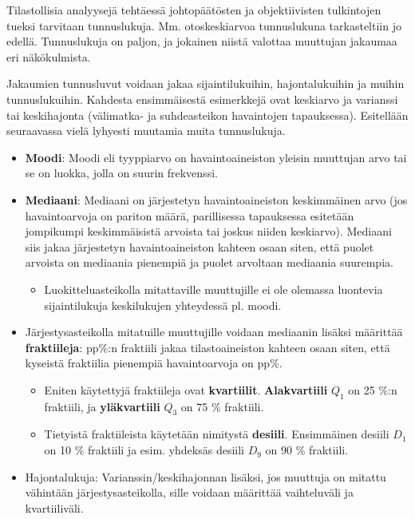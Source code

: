 \documentclass[
]{book}
\providecommand{\tightlist}{%
  \setlength{\itemsep}{0pt}\setlength{\parskip}{0pt}}
\begin{document}
Tilastollisia analyysejä tehtäessä johtopäätösten ja objektiivisten tulkintojen tueksi tarvitaan tunnuslukuja. Mm. otoskeskiarvoa tunnuslukuna tarkasteltiin jo edellä. Tunnuslukuja on paljon, ja jokainen niistä valottaa muuttujan jakaumaa eri näkökulmista.

Jakaumien tunnusluvut voidaan jakaa sijaintilukuihin, hajontalukuihin ja muihin tunnuslukuihin. Kahdesta ensimmäisestä esimerkkejä ovat keskiarvo ja varianssi tai keskihajonta (välimatka- ja suhdeasteikon havaintojen tapauksessa). Esitellään seuraavassa vielä lyhyesti muutamia muita tunnuslukuja.

\begin{itemize}
\tightlist
\item
  \textbf{Moodi}: Moodi eli tyyppiarvo on havaintoaineiston yleisin muuttujan arvo tai se on luokka, jolla on suurin frekvenssi.
\item
  \textbf{Mediaani}: Mediaani on järjestetyn havaintoaineiston keskimmäinen arvo (jos havaintoarvoja on pariton määrä, parillisessa tapauksessa esitetään jompikumpi keskimmäisistä arvoista tai joskus niiden keskiarvo). Mediaani siis jakaa järjestetyn havaintoaineiston kahteen osaan siten, että puolet arvoista on mediaania pienempiä ja puolet arvoltaan mediaania suurempia.

  \begin{itemize}
  \tightlist
  \item
    Luokitteluasteikolla mitattaville muuttujille ei ole olemassa luontevia sijaintilukuja keskilukujen yhteydessä pl. moodi.
  \end{itemize}
\item
  Järjestysasteikolla mitatuille muuttujille voidaan mediaanin lisäksi määrittää \textbf{fraktiileja}: pp\%:n fraktiili jakaa tilastoaineiston kahteen osaan siten, että kyseistä fraktiilia pienempiä havaintoarvoja on pp\%.

  \begin{itemize}
  \tightlist
  \item
    Eniten käytettyjä fraktiileja ovat \textbf{kvartiilit}. \textbf{Alakvartiili} \(Q_1\) on 25 \%:n fraktiili, ja \textbf{yläkvartiili} \(Q_3\) on 75 \% fraktiili.
  \item
    Tietyistä fraktiileista käytetään nimitystä \textbf{desiili}. Ensimmäinen desiili \(D_1\) on 10 \% fraktiili ja esim. yhdeksäs desiili \(D_9\) on 90 \% fraktiili.
  \end{itemize}
\item
  Hajontalukuja: Varianssin/keskihajonnan lisäksi, jos muuttuja on mitattu vähintään järjestysasteikolla, sille voidaan määrittää vaihteluväli ja kvartiiliväli.


\end{itemize}
\end{document}
